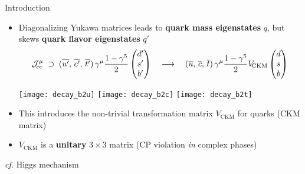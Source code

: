 \begin{frame}{Introduction}
    \begin{itemize}
        \item Diagonalizing Yukawa matrices\ftnt{} leads to \textbf{quark \textcolor{vertexDarkRed}{mass} eigenstates} $q$, but skews \textbf{quark \textcolor{vertexDarkRed}{flavor} eigenstates} $q'$
        \begin{equation*}
            \mathcal{J}^\mu_{\!cc} \; \supset \;
            (\overline{u'},\, \overline{c'},\, \overline{t'}) \, \gamma^\mu \frac{1-\gamma^5}{2} \begin{pmatrix}d' \\ s' \\ b' \end{pmatrix}
            \quad \longrightarrow \quad
            (\overline{u},\, \overline{c},\, \overline{t}) \, \gamma^\mu \frac{1-\gamma^5}{2} V_\text{\!CKM} \begin{pmatrix}d \\ s \\ b \end{pmatrix}
        \end{equation*}
        \begin{center}
            \texttt{[image: decay\_b2u]}
            \scalebox{1.5}{\;+\;}
            \texttt{[image: decay\_b2c]}
            \scalebox{1.5}{\;+\;}
            \texttt{[image: decay\_b2t]}
        \end{center}
        \vspace{1em}
        \item This introduces the non-trivial transformation matrix $V_\text{CKM}$ for quarks (CKM matrix)
        \item $V_\text{CKM}$ is a \textbf{unitary} $3 \times 3$ matrix (CP violation \textit{in} complex phases)
    \end{itemize}

    \vspace{5mm}
    \footnotesize \ftnt{}\textit{cf.} Higgs mechanism
\end{frame}

